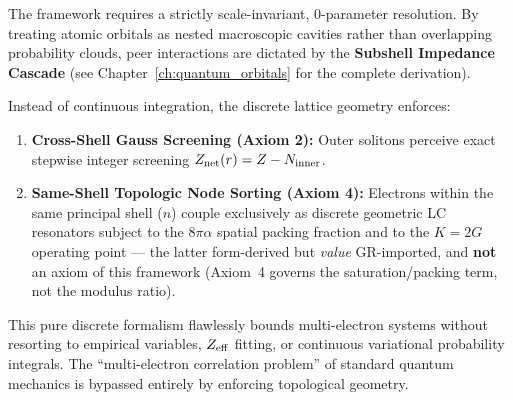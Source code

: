 The framework requires a strictly scale-invariant, 0-parameter resolution. By treating atomic orbitals as nested macroscopic cavities rather than overlapping probability clouds, peer interactions are dictated by the \textbf{Subshell Impedance Cascade} (see Chapter~\ref{ch:quantum_orbitals} for the complete derivation). 

Instead of continuous integration, the discrete lattice geometry enforces:
\begin{enumerate}
    \item \textbf{Cross-Shell Gauss Screening (Axiom 2):} Outer solitons perceive exact stepwise integer screening $Z_{\rm net}(r) = Z - N_{\rm inner}$.
    \item \textbf{Same-Shell Topologic Node Sorting (Axiom 4):} Electrons within the same principal shell ($n$) couple exclusively as discrete geometric LC resonators subject to the $8\pi\alpha$ spatial packing fraction and to the $K = 2G$ operating point --- the latter form-derived but \emph{value} GR-imported, and \textbf{not} an axiom of this framework (Axiom~4 governs the saturation/packing term, not the modulus ratio).
\end{enumerate}

This pure discrete formalism flawlessly bounds multi-electron systems without resorting to empirical variables, $Z_{\rm eff}$ fitting, or continuous variational probability integrals. The ``multi-electron correlation problem'' of standard quantum mechanics is bypassed entirely by enforcing topological geometry.

